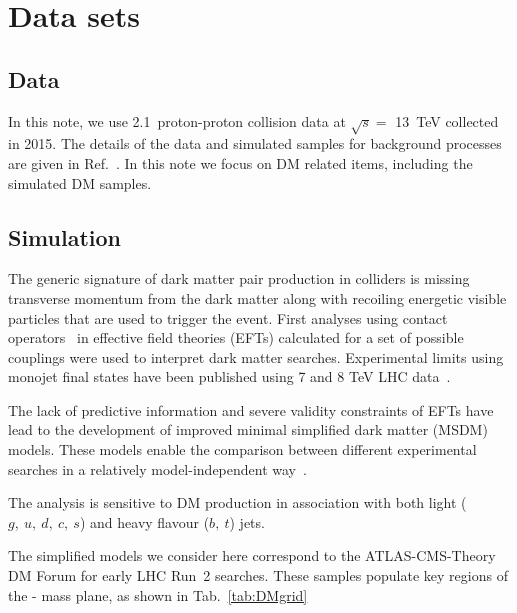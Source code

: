 \section{Data sets}
\label{sec:datasets}

\subsection{Data}


In this note, we use 2.1~\ifb proton-proton collision data at $\sqrt{s} =$ 13~TeV collected in 2015. The details of the data and
simulated samples for background processes are given in Ref.~\cite{alphaTnote}. In this note we focus on DM related items, including the simulated DM samples. 

\subsection{Simulation}

The generic signature of dark matter pair production in colliders is missing
transverse momentum from the dark matter along with recoiling energetic visible
particles that are used to trigger the event. First analyses using contact 
operators~\cite{Goodman:2010ku} in effective field theories (EFTs) calculated for a set of possible
couplings were used to interpret dark matter searches. Experimental limits using
monojet final states have been published using 7 and 8 TeV LHC 
data~\cite{Chatrchyan:2012me,ATLAS:2012ky}. 

The lack of predictive information and severe validity constraints of EFTs have
lead to the development of improved minimal simplified dark matter (MSDM) models.
These models enable the comparison between different experimental
searches in a relatively model-independent way~\cite{Buchmueller:2014yoa}.

The \alphat analysis is sensitive to DM production in association with both
light ($g,~u,~d,~c,~s$) and heavy flavour ($b,~t$) jets. 

The simplified models we consider here correspond to the  ATLAS-CMS-Theory DM Forum 
for early LHC Run~2 searches. These samples populate key regions of the
{\mphi-\mchi} mass plane, as shown in Tab.~\ref{tab:DMgrid}

